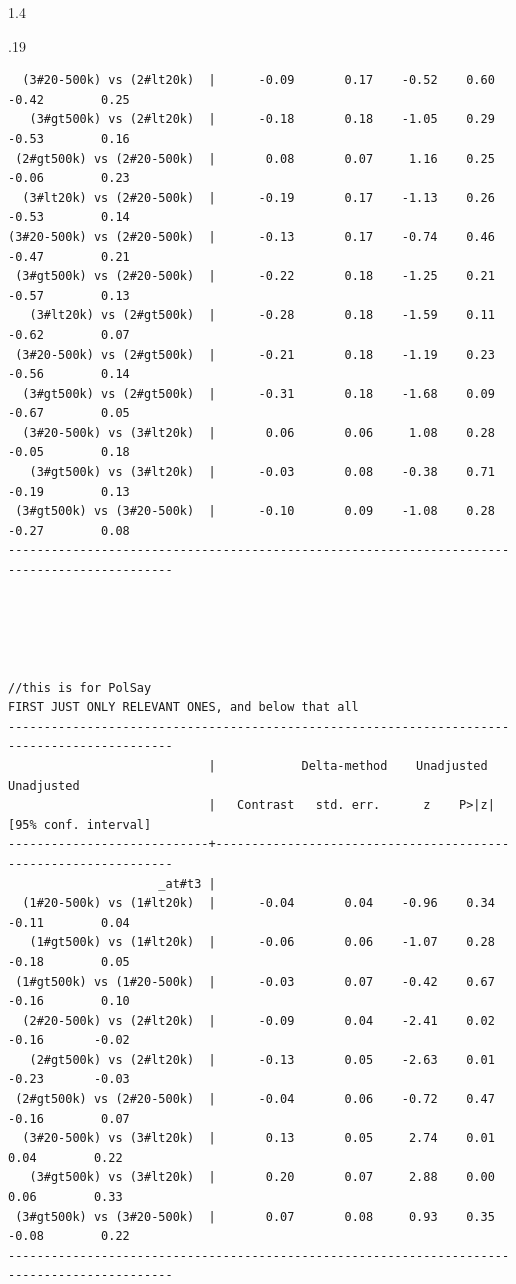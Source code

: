 \documentclass[10pt, letterpaper]{article}
\begin{document}
\begin{spacing}{1.4}
\begin{scriptsize}
\begin{spacing}{.19}
\begin{verbatim}
  (3#20-500k) vs (2#lt20k)  |      -0.09       0.17    -0.52    0.60        -0.42        0.25
   (3#gt500k) vs (2#lt20k)  |      -0.18       0.18    -1.05    0.29        -0.53        0.16
 (2#gt500k) vs (2#20-500k)  |       0.08       0.07     1.16    0.25        -0.06        0.23
  (3#lt20k) vs (2#20-500k)  |      -0.19       0.17    -1.13    0.26        -0.53        0.14
(3#20-500k) vs (2#20-500k)  |      -0.13       0.17    -0.74    0.46        -0.47        0.21
 (3#gt500k) vs (2#20-500k)  |      -0.22       0.18    -1.25    0.21        -0.57        0.13
   (3#lt20k) vs (2#gt500k)  |      -0.28       0.18    -1.59    0.11        -0.62        0.07
 (3#20-500k) vs (2#gt500k)  |      -0.21       0.18    -1.19    0.23        -0.56        0.14
  (3#gt500k) vs (2#gt500k)  |      -0.31       0.18    -1.68    0.09        -0.67        0.05
  (3#20-500k) vs (3#lt20k)  |       0.06       0.06     1.08    0.28        -0.05        0.18
   (3#gt500k) vs (3#lt20k)  |      -0.03       0.08    -0.38    0.71        -0.19        0.13
 (3#gt500k) vs (3#20-500k)  |      -0.10       0.09    -1.08    0.28        -0.27        0.08
---------------------------------------------------------------------------------------------





//this is for PolSay
FIRST JUST ONLY RELEVANT ONES, and below that all
---------------------------------------------------------------------------------------------
                            |            Delta-method    Unadjusted           Unadjusted
                            |   Contrast   std. err.      z    P>|z|     [95% conf. interval]
----------------------------+----------------------------------------------------------------
                     _at#t3 |
  (1#20-500k) vs (1#lt20k)  |      -0.04       0.04    -0.96    0.34        -0.11        0.04
   (1#gt500k) vs (1#lt20k)  |      -0.06       0.06    -1.07    0.28        -0.18        0.05
 (1#gt500k) vs (1#20-500k)  |      -0.03       0.07    -0.42    0.67        -0.16        0.10
  (2#20-500k) vs (2#lt20k)  |      -0.09       0.04    -2.41    0.02        -0.16       -0.02
   (2#gt500k) vs (2#lt20k)  |      -0.13       0.05    -2.63    0.01        -0.23       -0.03
 (2#gt500k) vs (2#20-500k)  |      -0.04       0.06    -0.72    0.47        -0.16        0.07
  (3#20-500k) vs (3#lt20k)  |       0.13       0.05     2.74    0.01         0.04        0.22
   (3#gt500k) vs (3#lt20k)  |       0.20       0.07     2.88    0.00         0.06        0.33
 (3#gt500k) vs (3#20-500k)  |       0.07       0.08     0.93    0.35        -0.08        0.22
---------------------------------------------------------------------------------------------




\end{verbatim}
\end{spacing}
\end{scriptsize}
\end{spacing}
\end{document}
